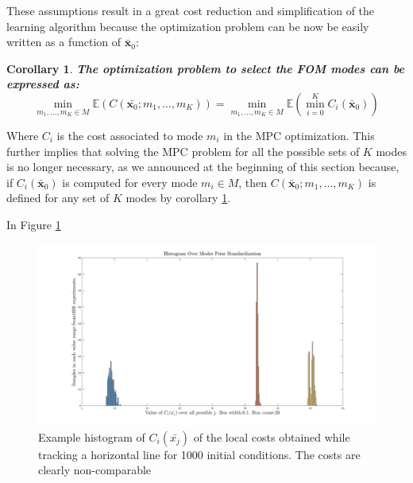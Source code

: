 \documentclass[12,twoside]{TFG-GM}
\newtheorem{corollary}[theorem]{Corollary}
\theoremstyle{definition}
\theoremstyle{remark}
\newcommand*\diff[1]{\bar{#1}}
\begin{document}
These assumptions result in a great cost reduction and simplification of the learning algorithm because the optimization problem can be now be easily written as a function of $\diff{\textbf{x}}_0$:
\begin{corollary} \textbf{The optimization problem to select the FOM modes can be expressed as:} \label{cor:costfunction} 
 $$\min\limits_{m_1, ..., m_K \in M}\mathbb{E}(C(\diff{\textbf{x}_0}; m_1, ..., m_K)) = \min\limits_{m_1, ..., m_K \in M}\mathbb{E}(\min\limits_{i = 0}^{K}{C_i(\diff{\textbf{x}}_0)})$$
 
\end{corollary}
Where $C_i$ is the cost associated to mode $m_i$ in the MPC optimization. This further implies that solving the MPC problem for all the possible sets of $K$ modes is no longer necessary, as we announced at the beginning of this section because, if $C_i(\diff{\textbf{x}}_0)$ is computed for every mode $m_i \in M$, then $C(\diff{\textbf{x}}_0; m_1, ..., m_K)$ is defined for any set of $K$ modes by corollary \ref{cor:costfunction}.

In Figure \ref{fig:hist_pre} 

\begin{figure}[htb!]
\begin{center}
\includegraphics[width=16cm]{hist_pre_std.jpg}
\end{center}
\caption{\label{fig:hist_pre} \small Example histogram of $C_i(\diff{x_j})$ of the local costs obtained while tracking a horizontal line for 1000 initial conditions. The costs are clearly non-comparable}
\end{figure}
\end{document}
